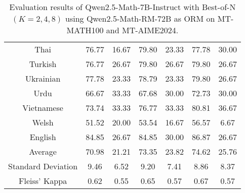 \begin{table*}[]
\begin{tabular}{c|cc|cc|cc}
Thai & 76.77 & 16.67 & 79.80 & 23.33 & 77.78 & 30.00 \\
Turkish & 76.77 & 26.67 & 79.80 & 26.67 & 79.80 & 26.67 \\
Ukrainian & 77.78 & 23.33 & 78.79 & 23.33 & 79.80 & 26.67 \\
Urdu & 66.67 & 33.33 & 67.68 & 30.00 & 72.73 & 30.00 \\
Vietnamese & 73.74 & 33.33 & 76.77 & 33.33 & 80.81 & 36.67 \\
Welsh & 51.52 & 20.00 & 53.54 & 16.67 & 56.57 & 6.67 \\
\rowcolor[HTML]{FCE5CD} 
English & 84.85 & 26.67 & 84.85 & 30.00 & 86.87 & 26.67 \\ \midrule
Average & 70.98 & 21.21 & 73.35 & 23.82 & 74.62 & 25.76 \\
Standard Deviation & 9.46 & 6.52 & 9.20 & 7.41 & 8.86 & 8.37 \\
Fleiss' Kappa & 0.62 & 0.55 & 0.65 & 0.57 & 0.67 & 0.57 \\ \bottomrule
\end{tabular}
\caption{\footnotesize Evaluation results of Qwen2.5-Math-7B-Instruct with Best-of-N \((K=2, 4, 8)\) using Qwen2.5-Math-RM-72B as ORM on MT-MATH100 and MT-AIME2024.}
\label{tab:7B_orm_72B}
\end{table*}

